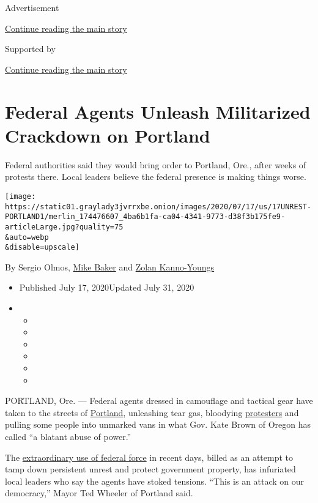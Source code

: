 Advertisement

\protect\hyperlink{after-top}{Continue reading the main story}

Supported by

\protect\hyperlink{after-sponsor}{Continue reading the main story}

\hypertarget{federal-agents-unleash-militarized-crackdown-on-portland}{%
\section{Federal Agents Unleash Militarized Crackdown on
Portland}\label{federal-agents-unleash-militarized-crackdown-on-portland}}

Federal authorities said they would bring order to Portland, Ore., after
weeks of protests there. Local leaders believe the federal presence is
making things worse.

\texttt{[image: https://static01.graylady3jvrrxbe.onion/images/2020/07/17/us/17UNREST-PORTLAND1/merlin\_174476607\_4ba6b1fa-ca04-4341-9773-d38f3b175fe9-articleLarge.jpg?quality=75\\\&auto=webp\\\&disable=upscale]}

By Sergio Olmos,
\href{https://www.nytimes3xbfgragh.onion/by/mike-baker}{Mike Baker} and
\href{https://www.nytimes3xbfgragh.onion/by/zolan-kanno-youngs}{Zolan
Kanno-Youngs}

\begin{itemize}
\item
  Published July 17, 2020Updated July 31, 2020
\item
  \begin{itemize}
  \item
  \item
  \item
  \item
  \item
  \item
  \end{itemize}
\end{itemize}

PORTLAND, Ore. --- Federal agents dressed in camouflage and tactical
gear have taken to the streets of
\href{https://www.nytimes3xbfgragh.onion/2020/07/23/podcasts/the-daily/portland-protests.html}{Portland},
unleashing tear gas, bloodying
\href{https://www.nytimes3xbfgragh.onion/2020/07/21/us/portland-protests.html}{protesters}
and pulling some people into unmarked vans in what Gov. Kate Brown of
Oregon has called ``a blatant abuse of power.''

The
\href{https://www.nytimes3xbfgragh.onion/2020/07/17/us/politics/federal-agents-portland-arrests.html}{extraordinary
use of federal force} in recent days, billed as an attempt to tamp down
persistent unrest and protect government property, has infuriated local
leaders who say the agents have stoked tensions. ``This is an attack on
our democracy,'' Mayor Ted Wheeler of Portland said.

